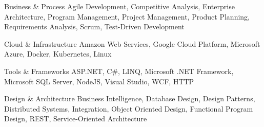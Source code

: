 


\begin{cvskills}


\cvskill
{Business \& Process}
{Agile Development, Competitive Analysis, Enterprise Architecture, Program Management, Project Management, Product Planning, Requirements Analysis, Scrum, Test-Driven Development}


\cvskill
{Cloud \& Infrastructure}
{Amazon Web Services, Google Cloud Platform, Microsoft Azure, Docker, Kubernetes, Linux}


\cvskill
{Tools \& Frameworks}
{ASP.NET, C\#, LINQ, Microsoft .NET Framework, Microsoft SQL Server, NodeJS, Visual Studio, WCF, HTTP}


\cvskill
{Design \& Architecture}
{Business Intelligence, Database Design, Design Patterns, Distributed Systems, Integration, Object Oriented Design, Functional Program Design, REST, Service-Oriented Architecture}


\end{cvskills}
